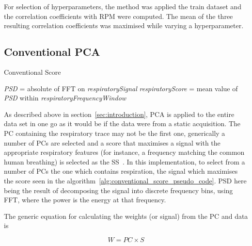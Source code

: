         For selection of hyperparameters, the method was applied the train dataset and the correlation coefficients with \gls{RPM} were computed. The mean of the three resulting correlation coefficients was maximised while varying a hyperparameter.
        
    \subsection{Conventional PCA} \label{sec:conventional_pca}
        \begin{algorithm} \label{alg:conventional_score_pseudo_code}
            \caption{Conventional Score}
            \;
            \;
            \textit{PSD} = absolute of \gls{FFT} on \textit{respiratorySignal}\;
            \;
            \textit{respiratoryScore} = mean value of \textit{PSD}  within \textit{respiratoryFrequencyWindow}\;
            \;
        \end{algorithm}
        
        As described above in section~\ref{sec:introduction}, \gls{PCA} is applied to the entire data set in one go as it would be if the data were from a static acquisition. The \gls{PC} containing the respiratory trace may not be the first one, generically a number of \glspl{PC} are selected and a score that maximises a signal with the appropriate respiratory features (for instance, a frequency matching the common human breathing) is selected as the \gls{SS}~\parencite{Bertolli2017}. In this implementation, to select from a number of \glspl{PC} the one which contains respiration, the signal which maximises the score seen in the algorithm~\ref{alg:conventional_score_pseudo_code}. \gls{PSD} here being the result of decomposing the signal into discrete frequency bins, using \gls{FFT}, where the power is the energy at that frequency.
        
        The generic equation for calculating the weights (or signal) from the \gls{PC} and data is
            
        \begin{equation} \label{eq:pc_weights}
            W = PC \times S
        \end{equation}
            
